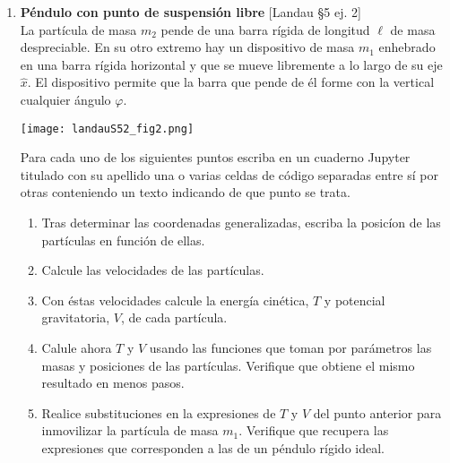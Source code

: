 \documentclass[11pt, spanish, a4paper, twoside]{article}
\begin{document}
\begin{enumerate}
\item
	\begin{minipage}[t][3cm]{0.7\textwidth}
		\textbf{Péndulo con punto de suspensión libre} [Landau \S5 ej. 2]\\
		La partícula de masa \(m_2\) pende de una barra rígida de longitud \(\ell\) de masa despreciable.
		En su otro extremo hay un dispositivo de masa \(m_1\) enhebrado en una barra rígida horizontal y que se mueve libremente a lo largo de su eje \(\hat{x}\).
		El dispositivo permite que la barra que pende de él forme con la vertical cualquier ángulo \(\varphi\). 
	\end{minipage}
	\begin{minipage}[c][2cm][t]{0.3\textwidth}
		\texttt{[image: landauS52\_fig2.png]}
	\end{minipage}
	Para cada uno de los siguientes puntos escriba en un cuaderno Jupyter titulado con su apellido una o varias celdas de código separadas entre sí por otras conteniendo un texto indicando de que punto se trata.
	\begin{enumerate}
		\item Tras determinar las coordenadas generalizadas, escriba la posicíon de las partículas en función de ellas.
		\item Calcule las velocidades de las partículas.
		\item Con éstas velocidades calcule la energía cinética, \(T\) y potencial gravitatoria, \(V\), de cada partícula.  
		\item Calule ahora \(T\) y \(V\) usando las funciones que toman por parámetros las masas y posiciones de las partículas. Verifique que obtiene el mismo resultado en menos pasos.
		\item Realice substituciones en la expresiones de \(T\) y \(V\) del punto anterior para inmovilizar la partícula de masa \(m_1\). Verifique que recupera las expresiones que corresponden a las de un péndulo rígido ideal.
	\end{enumerate}




\end{enumerate}
\end{document}
